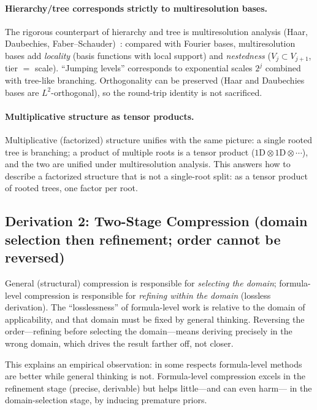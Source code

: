 \documentclass[11pt]{article}
\begin{document}
\paragraph{Hierarchy/tree corresponds strictly to multiresolution bases.}
The rigorous counterpart of hierarchy and tree is multiresolution analysis
(Haar, Daubechies, Faber--Schauder)~\cite{daubechies_1988}: compared with
Fourier bases, multiresolution bases add \emph{locality} (basis functions with
local support) and \emph{nestedness} ($V_j \subset V_{j+1}$, tier $=$ scale).
``Jumping levels'' corresponds to exponential scales $2^{j}$ combined with
tree-like branching. Orthogonality can be preserved (Haar and Daubechies bases
are $L^{2}$-orthogonal), so the round-trip identity is not sacrificed.

\paragraph{Multiplicative structure as tensor products.}
Multiplicative (factorized) structure unifies with the same picture: a single
rooted tree is branching; a product of multiple roots is a tensor product
($1\mathrm{D}\otimes1\mathrm{D}\otimes\cdots$), and the two are unified under
multiresolution analysis. This answers how to describe a factorized structure
that is not a single-root split: as a tensor product of rooted trees, one
factor per root.

\subsection{Derivation 2: Two-Stage Compression (domain selection then refinement; order cannot be reversed)}
\label{sec:twostage}

General (structural) compression is responsible for \emph{selecting the domain};
formula-level compression is responsible for \emph{refining within the domain}
(lossless derivation). The ``losslessness'' of formula-level work is relative to
the domain of applicability, and that domain must be fixed by general thinking.
Reversing the order---refining before selecting the domain---means deriving
precisely in the wrong domain, which drives the result farther off, not closer.

This explains an empirical observation: in some respects formula-level methods
are better while general thinking is not. Formula-level compression excels in
the refinement stage (precise, derivable) but helps little---and can even harm---
in the domain-selection stage, by inducing premature priors.
\end{document}
